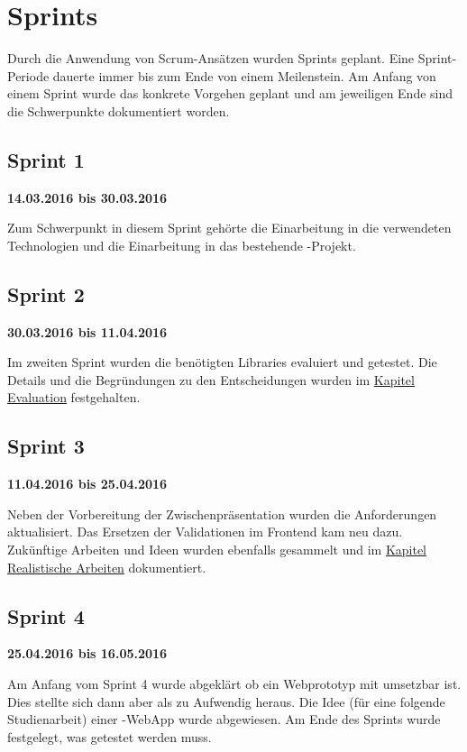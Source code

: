 \section{Sprints}
Durch die Anwendung von Scrum-Ansätzen wurden Sprints geplant. 
Eine Sprint-Periode dauerte immer bis zum Ende von einem Meilenstein. 
Am Anfang von einem Sprint wurde das konkrete Vorgehen geplant und am jeweiligen Ende sind die Schwerpunkte dokumentiert worden.


\subsection{Sprint 1}
\textbf{14.03.2016 bis 30.03.2016}

Zum Schwerpunkt in diesem Sprint gehörte die Einarbeitung in die verwendeten Technologien und die Einarbeitung in das bestehende \kort{}-Projekt.

\subsection{Sprint 2}
\textbf{30.03.2016 bis 11.04.2016}

Im zweiten Sprint wurden die benötigten Libraries evaluiert und getestet.
Die Details und die Begründungen zu den Entscheidungen wurden im \hyperref[tb-evaluation]{Kapitel Evaluation} festgehalten.

\subsection{Sprint 3}
\textbf{11.04.2016 bis 25.04.2016}

Neben der Vorbereitung der Zwischenpräsentation wurden die Anforderungen aktualisiert. 
Das Ersetzen der Validationen im Frontend kam neu dazu. 
Zukünftige Arbeiten und Ideen wurden ebenfalls gesammelt und im \hyperref[pd-weiterentwicklung-realistisch]{Kapitel Realistische Arbeiten} dokumentiert.

\subsection{Sprint 4}
\textbf{25.04.2016 bis 16.05.2016}

Am Anfang vom Sprint 4 wurde abgeklärt ob ein Webprototyp mit  umsetzbar ist. 
Dies stellte sich dann aber als zu Aufwendig heraus. 
Die Idee (für eine folgende Studienarbeit) einer -\gls{WebApp} wurde abgewiesen.
Am Ende des Sprints wurde festgelegt, was getestet werden muss.

